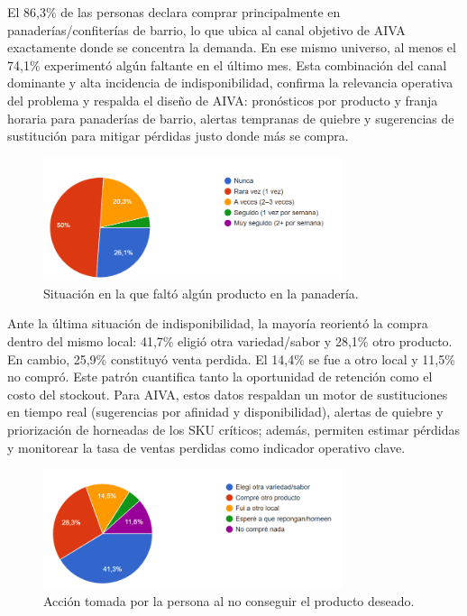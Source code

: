 El 86,3\% de las personas declara comprar principalmente en panaderías/confiterías de barrio, lo que ubica al canal objetivo de AIVA exactamente donde se concentra la demanda. En ese mismo universo, al menos el 74,1\% experimentó algún faltante en el último mes. Esta combinación del canal dominante y alta incidencia de indisponibilidad, confirma la relevancia operativa del problema y respalda el diseño de AIVA: pronósticos por producto y franja horaria para panaderías de barrio, alertas tempranas de quiebre y sugerencias de sustitución para mitigar pérdidas justo donde más se compra.

\begin{figure}[t]
    \centering
    \includegraphics[width=0.78\textwidth]{images/NoHubieraProducto.png}
    \caption{Situación en la que faltó algún producto en la panadería.}
    \label{fig:no-hubiera-producto}
\end{figure}


Ante la última situación de indisponibilidad, la mayoría reorientó la compra dentro del mismo local: 41,7\% eligió otra variedad/sabor y 28,1\% otro producto. En cambio, 25,9\% constituyó venta perdida. El 14,4\% se fue a otro local y 11,5\% no compró. Este patrón cuantifica tanto la oportunidad de retención como el costo del stockout. Para AIVA, estos datos respaldan un motor de sustituciones en tiempo real (sugerencias por afinidad y disponibilidad), alertas de quiebre y priorización de horneadas de los SKU críticos; además, permiten estimar pérdidas y monitorear la tasa de ventas perdidas como indicador operativo clave.


\begin{figure}[t]
    \centering
    \includegraphics[width=0.78\textwidth]{images/AccionPosterior.png}
    \caption{Acción tomada por la persona al no conseguir el producto deseado.}
    \label{fig:accion-posterior}
\end{figure}


